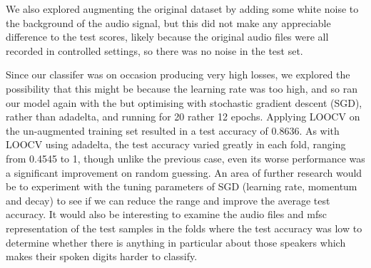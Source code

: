\documentclass{article} %
\begin{document}
We also explored augmenting the original dataset by adding some white noise to the background of the audio signal, but this did not make any appreciable difference to the test scores, likely because the original audio files were all recorded in controlled settings, so there was no noise in the test set.

Since our classifer was on occasion producing very high losses, we explored the possibility that this might be because the learning rate was too high, and so ran our model again with the but optimising with stochastic gradient descent (SGD), rather than adadelta, and running for 20 rather 12 epochs. Applying LOOCV on the un-augmented training set resulted in a test accuracy of 0.8636. As with LOOCV using adadelta, the test accuracy varied greatly in each fold, ranging from 0.4545 to 1, though unlike the previous case, even its worse performance was a significant improvement on random guessing. An area of further research would be to experiment with the tuning parameters of SGD (learning rate, momentum and decay) to see if we can reduce the range and improve the average test accuracy. It would also be interesting to examine the audio files and mfsc representation of the test samples in the folds where the test accuracy was low to determine whether there is anything in particular about those speakers which makes their spoken digits harder to classify. 
\end{document}

